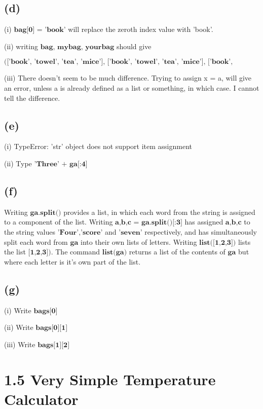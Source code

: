 \subsection*{(d)}
(i) $\textbf{bag[0] = 'book'}$ will replace the zeroth index value with 'book'.

(ii) writing $\textbf{bag, mybag, yourbag}$ should give

$\textbf{(['book', 'towel', 'tea', 'mice'],
 ['book', 'towel', 'tea', 'mice'],
 ['book', 'towel', 'tea', 42, 'money'])}$

(iii) There doesn't seem to be much difference. Trying to assign x = a, will give an error, unless a is already defined as a list or something, in which case. I cannot tell the difference. 

\subsection*{(e)}
(i) TypeError: 'str' object does not support item assignment

(ii) Type $\textbf{'Three' + ga[:4]}$
\subsection*{(f)}
Writing $\textbf{ga.split()}$ provides a list, in which each word from the string is assigned to a component of the list. Writing $\textbf{a,b,c = ga.split()[:3]}$ has assigned $\textbf{a,b,c}$ to the string values $\textbf{'Four','score'}$ and $\textbf{'seven'}$ respectively, and has simultaneously split each word from $\textbf{ga}$ into their own lists of letters. Writing $\textbf{list([1,2,3])}$ lists the list $\textbf{[1,2,3])}$. The command $\textbf{list(ga)}$ returns a list of the contents of $\textbf{ga}$ but where each letter is it's own part of the list.
\subsection*{(g)}
(i) Write $\textbf{bags[0]}$

(ii) Write $\textbf{bags[0][1]}$

(iii) Write $\textbf{bags[1][2]}$

\section*{1.5 Very Simple Temperature Calculator}

